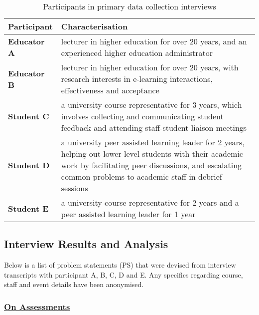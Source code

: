 \begin{table}[!h] 
    \caption{Participants in primary data collection interviews}
    \centering
    \label{table:participants-req}
    \begin{tabularx}{\textwidth}{>{\bfseries}lX}
        Participant & Characterisation\\
        \toprule
        Educator A & lecturer in higher education for over 20 years, and an experienced higher education 
        administrator\\\midrule
        Educator B & lecturer in higher education for over 20 years, with research interests 
        in e-learning interactions, effectiveness and acceptance\\\midrule
        Student C & a university course representative for 3 years, which involves collecting and 
        communicating student feedback and attending staff-student liaison meetings \\\midrule
        Student D & a university peer assisted learning leader for 2 years, helping out lower level 
        students with their academic work by facilitating peer discussions, and escalating common problems
        to academic staff in debrief sessions\\\midrule
        Student E & a university course representative for 2 years and a peer assisted learning leader 
        for 1 year\\\bottomrule
    \end{tabularx}
\end{table}

\subsection{Interview Results and Analysis}

Below is a list of problem statements (PS) that were devised from interview transcripts with 
participant A, B, C, D and E. Any specifics regarding course, staff and event details 
have been anonymised.

\subsubsection{\underline{On Assessments}}

